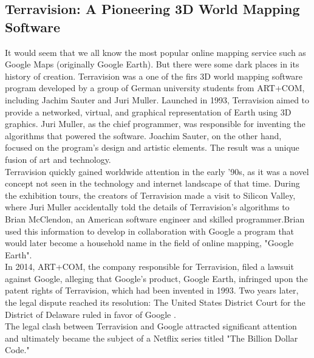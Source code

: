 \documentclass[10pt,oneside,english,a4paper]{article}
\begin{document}
\subsection{Terravision: A Pioneering 3D World Mapping Software} \label{history:patentrights}
It would seem that we all know the most popular online mapping service such as Google Maps (originally Google Earth). But there were some dark places in its history of creation. Terravision\cite{Leclerc1994} was a one of the firs 3D world mapping software program developed by a group of German university students from ART+COM, including Jachim Sauter and Juri Muller. Launched in 1993, Terravision aimed to provide a networked, virtual, and graphical representation of Earth using 3D graphics. Juri Muller, as the chief programmer, was responsible for inventing the algorithms that powered the software. Joachim Sauter, on the other hand, focused on the program's design and artistic elements. The result was a unique fusion of art and technology.
\\Terravision quickly gained worldwide attention in the early '90s, as it was a novel concept not seen in the technology and internet landscape of that time. During the exhibition tours, the creators of Terravision made a visit to Silicon Valley, where Juri Muller accidentally told the details of Terravision's algorithms to Brian McClendon, an American software engineer and skilled programmer.Brian used this information to develop in collaboration with Google a program that would later become a household name in the field of online mapping, "Google Earth".
\\In 2014, ART+COM, the company responsible for Terravision, filed a lawsuit against Google, alleging that Google's product, Google Earth, infringed upon the patent rights of Terravision, which had been invented in 1993. Two years later, the legal dispute reached its resolution: The United States District Court for the District of Delaware ruled in favor of Google \cite{ArtcomGoogle2017}.
\\The legal clash between Terravision and Google attracted significant attention and ultimately became the subject of a Netflix series titled "The Billion Dollar Code."
\end{document}
